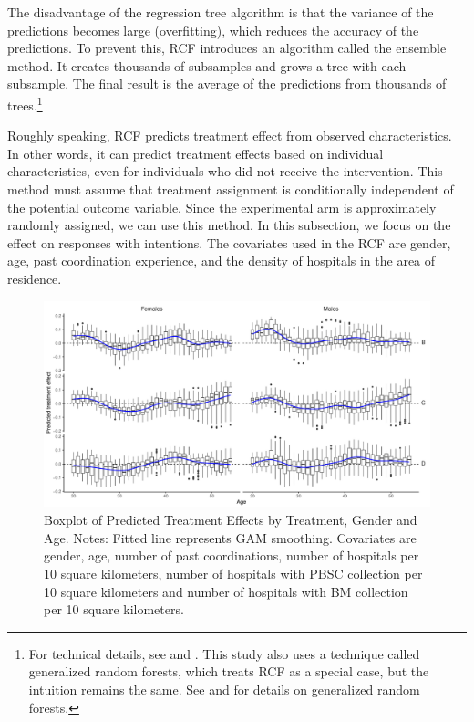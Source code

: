 \documentclass[
]{article}
\begin{document}
The disadvantage of the regression tree algorithm is that the variance of the predictions becomes large (overfitting), which reduces the accuracy of the predictions. To prevent this, RCF introduces an algorithm called the ensemble method. It creates thousands of subsamples and grows a tree with each subsample. The final result is the average of the predictions from thousands of trees.\footnote{For technical details, see \citet{Athey2016} and \citet{Wager2018}. This study also uses a technique called generalized random forests, which treats RCF as a special case, but the intuition remains the same. See \citet{Athey2019} and \citet{Athey2019a} for details on generalized random forests.}

Roughly speaking, RCF predicts treatment effect from observed characteristics. In other words, it can predict treatment effects based on individual characteristics, even for individuals who did not receive the intervention. This method must assume that treatment assignment is conditionally independent of the potential outcome variable. Since the experimental arm is approximately randomly assigned, we can use this method. In this subsection, we focus on the effect on responses with intentions. The covariates used in the RCF are gender, age, past coordination experience, and the density of hospitals in the area of residence.

\begin{figure}[t]
\includegraphics{body_files/figure-latex/boxplot-rcf-int-1} \caption{Boxplot of Predicted Treatment Effects by Treatment, Gender and Age. Notes: Fitted line represents GAM smoothing. Covariates are gender, age, number of past coordinations, number of hospitals per 10 square kilometers, number of hospitals with PBSC collection per 10 square kilometers and number of hospitals with BM collection per 10 square kilometers.}\label{fig:boxplot-rcf-int}
\end{figure}
\end{document}
